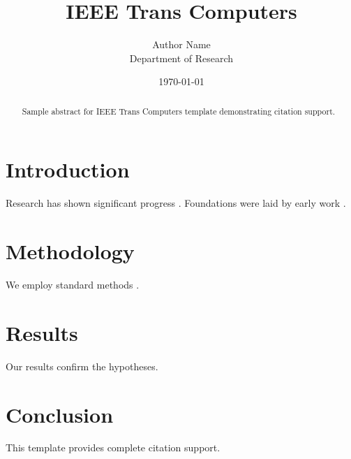 ﻿\documentclass{IEEEtran}
\title{IEEE Trans Computers}
\author{Author Name \\ \small Department of Research}
\date{\today}
\begin{document}
\maketitle

\begin{abstract}
Sample abstract for IEEE Trans Computers template demonstrating citation support.
\end{abstract}

\section{Introduction}
Research has shown significant progress \citep{einstein1905}. Foundations were laid by early work \citep{turing1950}.

\section{Methodology}
We employ standard methods \citep{knuth1984}.

\section{Results}
Our results confirm the hypotheses.

\section{Conclusion}
This template provides complete citation support.



\end{document}
